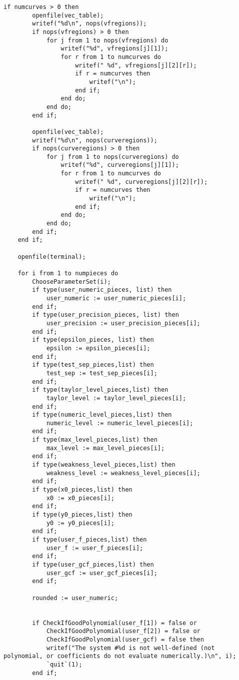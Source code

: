 \documentclass[a4paper,10pt]{article}
\begin{document}
\begin{lstlisting}[name=main]
    if numcurves > 0 then
        openfile(vec_table);
        writef("%d\n", nops(vfregions));
        if nops(vfregions) > 0 then
            for j from 1 to nops(vfregions) do
                writef("%d", vfregions[j][1]);
                for r from 1 to numcurves do
                    writef(" %d", vfregions[j][2][r]);
                    if r = numcurves then
                        writef("\n");
                    end if;
                end do;
            end do;
        end if;

        openfile(vec_table);
        writef("%d\n", nops(curveregions));
        if nops(curveregions) > 0 then
            for j from 1 to nops(curveregions) do
                writef("%d", curveregions[j][1]);
                for r from 1 to numcurves do
                    writef(" %d", curveregions[j][2][r]);
                    if r = numcurves then
                        writef("\n");
                    end if;
                end do;
            end do;
        end if;
    end if;

    openfile(terminal);

    for i from 1 to numpieces do
        ChooseParameterSet(i);
        if type(user_numeric_pieces, list) then
            user_numeric := user_numeric_pieces[i];
        end if;
        if type(user_precision_pieces, list) then
            user_precision := user_precision_pieces[i];
        end if;
        if type(epsilon_pieces, list) then
            epsilon := epsilon_pieces[i];
        end if;
        if type(test_sep_pieces,list) then
            test_sep := test_sep_pieces[i];
        end if;
        if type(taylor_level_pieces,list) then
            taylor_level := taylor_level_pieces[i];
        end if;
        if type(numeric_level_pieces,list) then
            numeric_level := numeric_level_pieces[i];
        end if;
        if type(max_level_pieces,list) then
            max_level := max_level_pieces[i];
        end if;
        if type(weakness_level_pieces,list) then
            weakness_level := weakness_level_pieces[i];
        end if;
        if type(x0_pieces,list) then
            x0 := x0_pieces[i];
        end if;
        if type(y0_pieces,list) then
            y0 := y0_pieces[i];
        end if;
        if type(user_f_pieces,list) then
            user_f := user_f_pieces[i];
        end if;
        if type(user_gcf_pieces,list) then
            user_gcf := user_gcf_pieces[i];
        end if;

        rounded := user_numeric;


        if CheckIfGoodPolynomial(user_f[1]) = false or
            CheckIfGoodPolynomial(user_f[2]) = false or
            CheckIfGoodPolynomial(user_gcf) = false then
            writef("The system #%d is not well-defined (not polynomial, or coefficients do not evaluate numerically.)\n", i);
            `quit`(1);
        end if;


\end{lstlisting}
\end{document}
